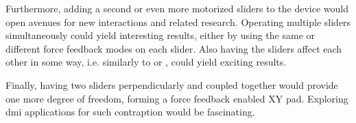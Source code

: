 Furthermore, adding a second or even more motorized sliders to the device would open avenues for new interactions and related research. Operating multiple sliders simultaneously could yield interesting results, either by using the same or different force feedback modes on each slider. Also having the sliders affect each other in some way, i.e. similarly to \textcite{kontogeorgakopoulos2019} or \textcite{bak2015}, could yield exciting results.

Finally, having two sliders perpendicularly and coupled together would provide one more degree of freedom, forming a force feedback enabled XY pad. Exploring \gls{dmi} applications for such contraption would be fascinating.